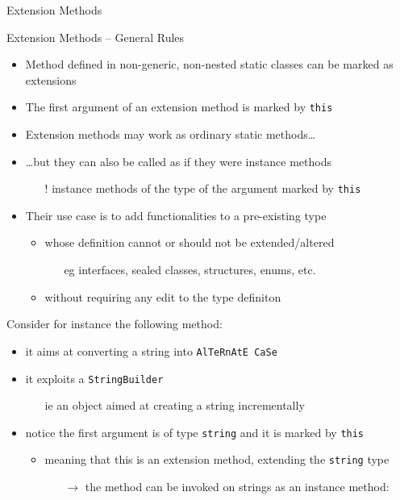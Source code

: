 \documentclass[presentation]{beamer}
\begin{document}
\begin{frame}[allowframebreaks]{Extension Methods}
  \begin{block}{Extension Methods -- General Rules}
    \begin{itemize}
      \item Method defined in non-generic, non-nested static classes can be marked as extensions
      \item The first argument of an extension method is marked by \texttt{this}
      \item Extension methods may work as ordinary static methods\ldots
      \item \ldots but they can also be called as if they were instance methods
      \begin{itemize}
        \item[!] instance methods of the type of the argument marked by \texttt{this}
      \end{itemize}
      \item Their use case is to add functionalities to a pre-existing type
      \begin{itemize}
        \item whose definition cannot or should not be extended/altered
        \begin{itemize}
          \item[eg] interfaces, sealed classes, structures, enums, etc.
        \end{itemize}
        \item without requiring any edit to the type definiton
      \end{itemize}
    \end{itemize}
  \end{block}

  \framebreak

  Consider for instance the following method:
  \begin{itemize}
    \item it aims at converting a string into \texttt{AlTeRnAtE CaSe}
    \item it exploits a \texttt{StringBuilder}
    \begin{itemize}
      \item[ie] an object aimed at creating a string incrementally
    \end{itemize}
    \item notice the first argument is of type \texttt{string} and it is marked by \texttt{this}
    \begin{itemize}
      \item meaning that this is an extension method, extending the \texttt{string} type
      \begin{itemize}
        \item[$\rightarrow$] the method can be invoked on strings as an instance method:
      \end{itemize}
    \end{itemize}
  \end{itemize}


\end{frame}
\end{document}
